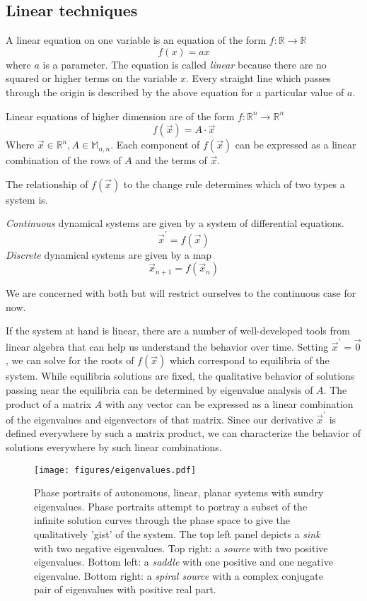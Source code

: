 \documentclass{elsart1p}
\begin{document}
\subsection{Linear techniques}
A linear equation on one variable is an equation of the form
$f : \mathbb{R} \rightarrow \mathbb{R}$
$$f(x) = ax$$ where $a$ is a parameter.
The equation is called
\textit{linear} because there are no squared or higher terms on the variable
$x$.  Every straight line which passes through the origin is described by the above equation for a particular value of $a$.

Linear equations of higher dimension are of the form 
$f : \mathbb{R}^{n} \rightarrow \mathbb{R}^{n}$
$$f(\vec{x}) = A \cdot \vec{x}$$
Where $\vec{x} \in \mathbb{R}^{n}, A \in \mathbb{M}_{n,n}$.  Each 
component of $f(\vec{x})$ can be expressed as a linear combination of the 
rows of $A$ and the terms of $\vec{x}$.

The relationship of $f(\vec{x})$ to the change rule determines which of two
types a system is.

\textit{Continuous} dynamical systems are given by
a system of differential equations.
$$\vec{x}^{\prime} = f(\vec{x})$$
\textit{Discrete} dynamical systems are given by a map
$$\vec{x}_{n+1} = f(\vec{x}_{n})$$

We are concerned with both but will restrict ourselves to the continuous case
for now.

If the system at hand is linear, there are a number of well-developed tools
from linear algebra that can help us understand the behavior over time.
Setting $\vec{x}^{\prime} = \vec{0}$, we can solve for the roots of 
$f(\vec{x})$ which correspond to equilibria of the system.  While 
equilibria solutions are fixed, the qualitative behavior of solutions passing
near the equilibria can be determined by eigenvalue analysis of $A$.
The product of a matrix $A$ with any vector can be expressed as a linear combination of the eigenvalues and eigenvectors of that matrix.  Since our 
derivative $\vec{x}^{\prime}$ is defined everywhere by such a matrix product,
we can characterize the behavior of solutions everywhere by such linear combinations.

\begin{figure}[htp]
\centering
\texttt{[image: figures/eigenvalues.pdf]}
\caption{Phase portraits of autonomous, linear, planar systems with 
    sundry eigenvalues.  Phase portraits attempt to portray a subset
of the infinite solution curves through the phase space to give the
qualitatively 'gist' of the system.
The top left panel depicts a \textit{sink} with two negative eigenvalues.
Top right:  a \textit{source} with two positive eigenvalues.  
Bottom left:  a \textit{saddle} with one positive and one negative eigenvalue.
Bottom right: a \textit{spiral source} with a complex conjugate pair of 
eigenvalues with positive real part.}
\label{fig:eigenvalues}
\end{figure}
\end{document}

